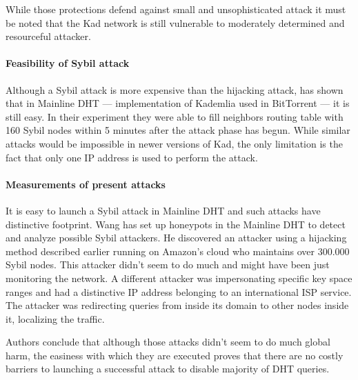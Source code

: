 While those protections defend against small and unsophisticated attack it must
be noted that the Kad network is still vulnerable to moderately determined and
resourceful attacker.

\paragraph{Feasibility of Sybil attack}
Although a Sybil attack is more expensive than the hijacking attack,
\cite{tim11} has shown that in Mainline DHT --- implementation of Kademlia used
in BitTorrent --- it is still easy.
In their experiment they were able to fill neighbors routing table with 160
Sybil nodes within 5 minutes after the attack phase has begun.
While similar attacks would be impossible in newer versions of Kad, the only
limitation is the fact that only one IP address is used to perform the attack.

\paragraph{Measurements of present attacks}
It is easy to launch a Sybil attack in Mainline DHT and such attacks have
distinctive footprint.
Wang \cite{wan12a} has set up honeypots in the Mainline DHT to detect and
analyze possible Sybil attackers.
He discovered an attacker using a hijacking method described earlier running on
Amazon's cloud who maintains over 300.000 Sybil nodes.
This attacker didn't seem to do much and might have been just monitoring the
network.
A different attacker was impersonating specific key space ranges and had a
distinctive IP address belonging to an international ISP service.
The attacker was redirecting queries from inside its domain to other nodes
inside it, localizing the traffic.

Authors conclude that although those attacks didn't seem to do much global harm,
the easiness with which they are executed proves that there are no costly
barriers to launching a successful attack to disable majority of DHT queries.
